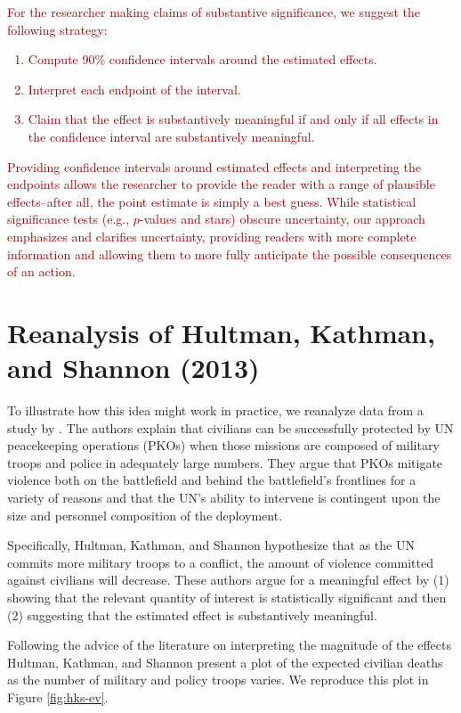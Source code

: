 \documentclass[12pt]{article}
\newcommand{\kelly}[1]{\textcolor{darkred}{#1}}
\begin{document}
\kelly{For the researcher making claims of substantive significance, we suggest the following strategy:
\begin{enumerate}
\item Compute 90\% confidence intervals around the estimated effects. 
\item Interpret each endpoint of the interval.
\item Claim that the effect is substantively meaningful if and only if all effects in the confidence interval are substantively meaningful.
\end{enumerate}
Providing confidence intervals around estimated effects and interpreting the endpoints allows the researcher to provide the reader with a range of plausible effects--after all, the point estimate is simply a best guess. While statistical significance tests (e.g., $p$-values and stars) obscure uncertainty, our approach emphasizes and clarifies uncertainty, providing readers with more complete information and allowing them to more fully anticipate the possible consequences of an action.}

\section*{Reanalysis of Hultman, Kathman, and Shannon (2013)}

To illustrate how this idea might work in practice, we reanalyze data from a study by \cite{HultmanKathmanShannon2013}. The authors explain that civilians can be successfully protected by UN peacekeeping operations (PKOs) when those missions are composed of military troops and police in adequately large numbers. They argue that PKOs mitigate violence both on the battlefield and behind the battlefield's frontlines for a variety of reasons and that the UN's ability to intervene is contingent upon the size and personnel composition of the deployment.

Specifically, Hultman, Kathman, and Shannon hypothesize that as the UN commits more military troops to a conflict, the amount of violence committed against civilians will decrease. These authors argue for a meaningful effect by (1) showing that the relevant quantity of interest is statistically significant and then (2) suggesting that the estimated effect is substantively meaningful.

Following the advice of the literature on interpreting the magnitude of the effects Hultman, Kathman, and Shannon present a plot of the expected civilian deaths as the number of military and policy troops varies. We reproduce this plot in Figure \ref{fig:hks-ev}.
\end{document}
